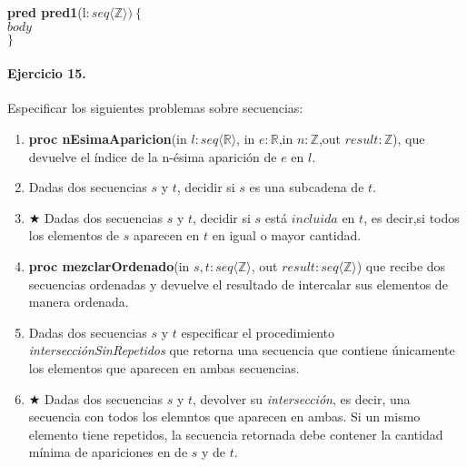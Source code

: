 \documentclass[a4paper]{article}
\begin{document}
\begin{enumerate}[label=\alph*)]
			\textbf{pred pred1}(l$: seq\langle \mathbb{Z}\rangle)\ \{$\smallskip \\
			\hspace*{6mm}$body$\\
			$\}$	
	\end{enumerate}
	
\paragraph*{Ejercicio 15.} Especificar los siguientes problemas sobre secuencias:
	\begin{enumerate}[label=\alph*)]
		\item \textbf{proc nEsimaAparicion}(in $l:seq\langle \mathbb{R}\rangle$,
			in $e:\mathbb{R}$,in $n:\mathbb{Z}$,out $result:\mathbb{Z}$), que devuelve
			el índice de la n-ésima aparición de $e$ en $l$.
		\item Dadas dos secuencias $s$ y $t$, decidir si $s$ es una subcadena de $t$.
		\item $\bigstar$ Dadas dos secuencias $s$ y $t$, decidir si $s$ está $incluida$ 
		en $t$, es decir,si todos los elementos de $s$ aparecen en $t$ en igual o mayor cantidad.
		\item \textbf{proc mezclarOrdenado}(in $s,t:seq\langle \mathbb{Z}\rangle$,
		out $result:seq\langle \mathbb{Z}\rangle$) que recibe dos secuencias ordenadas y devuelve
			el resultado de intercalar sus elementos de manera ordenada.
		\item Dadas dos secuencias $s$ y $t$ especificar el procedimiento 
				\textit{intersecciónSinRepetidos} que retorna una secuencia que contiene
				únicamente los elementos que aparecen en ambas secuencias.
		\item $\bigstar$ Dadas dos secuencias $s$ y $t$, devolver su \textit{intersección}, es
				decir, una secuencia con todos los elemntos que aparecen en ambas. Si un mismo
				elemento tiene repetidos, la secuencia retornada debe contener la cantidad
				mínima de apariciones en de $s$ y de $t$.
	\end{enumerate}
\end{document}

